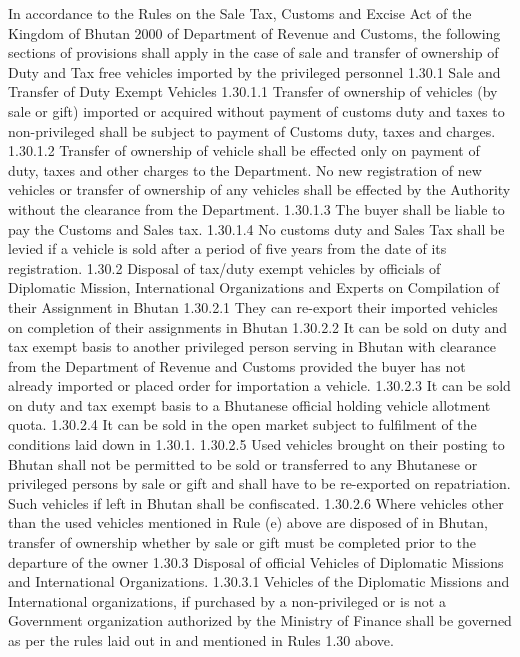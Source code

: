\documentclass[
]{book}
\begin{document}
In accordance to the Rules on the Sale Tax, Customs and Excise Act of the Kingdom of Bhutan 2000 of Department of Revenue and Customs, the following sections of provisions shall apply in the case of sale and transfer of ownership of Duty and Tax free vehicles imported by the privileged personnel
1.30.1 Sale and Transfer of Duty Exempt Vehicles
1.30.1.1 Transfer of ownership of vehicles (by sale or gift) imported or acquired without payment of customs duty and taxes to non-privileged shall be subject to payment of Customs duty, taxes and charges.
1.30.1.2 Transfer of ownership of vehicle shall be effected only on payment of duty, taxes and other charges to the Department. No new registration of new vehicles or transfer of ownership of any vehicles shall be effected by the Authority without the clearance from the Department.
1.30.1.3 The buyer shall be liable to pay the Customs and Sales tax.
1.30.1.4 No customs duty and Sales Tax shall be levied if a vehicle is sold after a period of five years from the date of its registration.
1.30.2 Disposal of tax/duty exempt vehicles by officials of Diplomatic Mission, International Organizations and Experts on Compilation of their Assignment in Bhutan
1.30.2.1 They can re-export their imported vehicles on completion of their assignments in Bhutan
1.30.2.2 It can be sold on duty and tax exempt basis to another privileged person serving in Bhutan with clearance from the Department of Revenue and Customs provided the buyer has not already imported or placed order for importation a vehicle.
1.30.2.3 It can be sold on duty and tax exempt basis to a Bhutanese official holding vehicle allotment quota.
1.30.2.4 It can be sold in the open market subject to fulfilment of the conditions laid down in 1.30.1.
1.30.2.5 Used vehicles brought on their posting to Bhutan shall not be permitted to be sold or transferred to any Bhutanese or privileged persons by sale or gift and shall have to be re-exported on repatriation. Such vehicles if left in Bhutan shall be confiscated.
1.30.2.6 Where vehicles other than the used vehicles mentioned in Rule (e) above are disposed of in Bhutan, transfer of ownership whether by sale or gift must be completed prior to the departure of the owner
1.30.3 Disposal of official Vehicles of Diplomatic Missions and International Organizations.
1.30.3.1 Vehicles of the Diplomatic Missions and International organizations, if purchased by a non-privileged or is not a Government organization authorized by the Ministry of Finance shall be governed as per the rules laid out in and mentioned in Rules 1.30 above.
\end{document}
